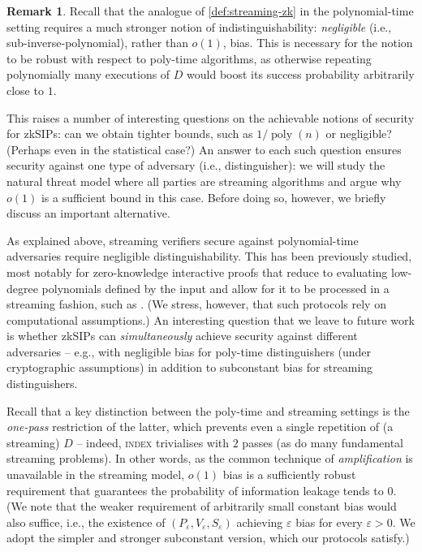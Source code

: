 \documentclass[10pt,a4paper]{article}
\theoremstyle{definition}
\newtheorem{remark}[theorem]{Remark}
\newcommand{\zksip}{\textrm{zkSIP}}
\newcommand{\poly}{\operatorname{poly}}
\newcommand{\eps}{\varepsilon}
\newcommand{\indexproblem}{\normalfont\textsc{index}\xspace}
\begin{document}
\begin{remark}
\label{rem:subconstant-bias}
    Recall that the analogue of \cref{def:streaming-zk} in the polynomial-time setting requires a much stronger notion of indistinguishability: \emph{negligible} (i.e., sub-inverse-polynomial), rather than $o(1)$, bias. This is necessary for the notion to be robust with respect to poly-time algorithms, as otherwise repeating polynomially many executions of $D$ would boost its success probability arbitrarily close to $1$.
    
    This raises a number of interesting questions on the achievable notions of security for \zksip{}s: can we obtain tighter bounds, such as $1/\poly(n)$ or negligible? (Perhaps even in the statistical case?) An answer to each such question ensures security against one type of adversary (i.e., distinguisher): we will study the natural threat model where all parties are streaming algorithms and argue why $o(1)$ is a sufficient bound in this case. Before doing so, however, we briefly discuss an important alternative.
    
    As explained above, streaming verifiers secure against polynomial-time adversaries require negligible distinguishability. This has been previously studied, most notably for zero-knowledge interactive proofs that reduce to evaluating low-degree polynomials defined by the input and allow for it to be processed in a streaming fashion, such as \cite{GKR08}. (We stress, however, that such protocols rely on computational assumptions.) An interesting question that we leave to future work is whether \zksip{}s can \emph{simultaneously} achieve security against different adversaries -- e.g., with negligible bias for poly-time distinguishers (under cryptographic assumptions) in addition to subconstant bias for streaming distinguishers.
    
    Recall that a key distinction between the poly-time and streaming settings is the \emph{one-pass} restriction of the latter, which prevents even a single repetition of (a streaming) $D$ -- indeed, \indexproblem trivialises with $2$ passes (as do many fundamental streaming problems). In other words, as the common technique of \emph{amplification} is unavailable in the streaming model, $o(1)$ bias is a sufficiently robust requirement that guarantees the probability of information leakage tends to $0$. (We note that the weaker requirement of arbitrarily small constant bias would also suffice, i.e., the existence of $(P_\eps, V_\eps, S_\eps)$ achieving $\eps$ bias for every $\eps > 0$. We adopt the simpler and stronger subconstant version, which our protocols satisfy.)
    
\end{remark}
\end{document}
